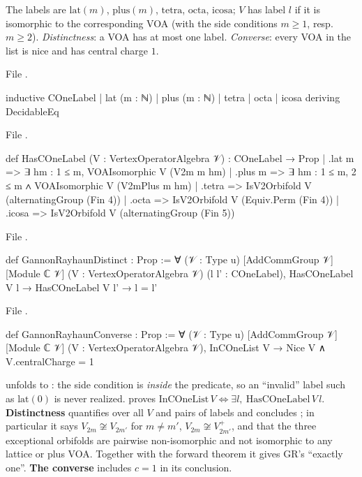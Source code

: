 \begin{definition}\label{l22:def:labels}
The labels are $\mathrm{lat}(m)$, $\mathrm{plus}(m)$, $\mathrm{tetra}$, $\mathrm{octa}$, $\mathrm{icosa}$;
$V$ has label $l$ if it is isomorphic to the corresponding VOA (with the side conditions $m\ge1$, resp.\ $m\ge2$).
\emph{Distinctness}: a VOA has at most one label. \emph{Converse}: every VOA in the list is nice and has
central charge $1$.
\end{definition}
\noindent File .
\begin{leancode}
inductive COneLabel
  | lat (m : ℕ)
  | plus (m : ℕ)
  | tetra
  | octa
  | icosa
  deriving DecidableEq
\end{leancode}
\noindent File .
\begin{leancode}
def HasCOneLabel (V : VertexOperatorAlgebra 𝒱) : COneLabel → Prop
  | .lat m => ∃ hm : 1 ≤ m, VOAIsomorphic V (V2m m hm)
  | .plus m => ∃ hm : 1 ≤ m, 2 ≤ m ∧ VOAIsomorphic V (V2mPlus m hm)
  | .tetra => IsV2Orbifold V (alternatingGroup (Fin 4))
  | .octa => IsV2Orbifold V (Equiv.Perm (Fin 4))
  | .icosa => IsV2Orbifold V (alternatingGroup (Fin 5))
\end{leancode}
\noindent File .
\begin{leancode}
def GannonRayhaunDistinct : Prop :=
  ∀ (𝒱 : Type u) [AddCommGroup 𝒱] [Module ℂ 𝒱] (V : VertexOperatorAlgebra 𝒱) (l l' : COneLabel),
    HasCOneLabel V l → HasCOneLabel V l' → l = l'
\end{leancode}
\noindent File .
\begin{leancode}
def GannonRayhaunConverse : Prop :=
  ∀ (𝒱 : Type u) [AddCommGroup 𝒱] [Module ℂ 𝒱] (V : VertexOperatorAlgebra 𝒱),
    InCOneList V → Nice V ∧ V.centralCharge = 1
\end{leancode}

\begin{dictionary}
 unfolds to : the side
condition is \emph{inside} the predicate, so an ``invalid'' label such as $\mathrm{lat}(0)$ is never realized.
 proves $\text{InCOneList}\,V \iff \exists l,\ \text{HasCOneLabel}\,V\,l$.
\textbf{Distinctness} quantifies over all $V$ and pairs of labels and concludes ; in particular it
says $V_{2m}\not\cong V_{2m'}$ for $m\ne m'$, $V_{2m}\not\cong V_{2m'}^+$, and that the three exceptional orbifolds
are pairwise non-isomorphic and not isomorphic to any lattice or plus VOA. Together with the forward theorem
it gives GR's ``exactly one''. \textbf{The converse} includes $c=1$ in its conclusion.
\end{dictionary}

